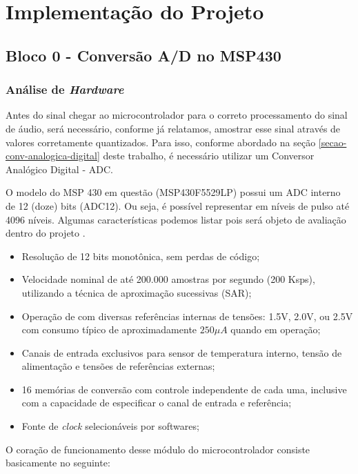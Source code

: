 \chapter{Implementação do Projeto}

\section{Bloco 0 - Conversão A/D no MSP430}
	
	\subsection{Análise de \textit{Hardware}}
	
		Antes do sinal chegar ao microcontrolador para o correto processamento do sinal de áudio, será necessário, conforme já relatamos, amostrar esse sinal através de valores corretamente quantizados. Para isso, conforme abordado na seção \ref{secao-conv-analogica-digital} deste trabalho, é necessário utilizar um Conversor Analógico Digital - ADC.
		
		O modelo do MSP 430 em questão (MSP430F5529LP) possui um ADC interno de 12 (doze) bits (ADC12). Ou seja, é possível representar em níveis de pulso até 4096 níveis. Algumas características podemos listar pois será objeto de avaliação dentro do projeto \cite{Davies2008}.
		
		\begin{itemize}
			\item Resolução de 12 bits monotônica, sem perdas de código;
			\item Velocidade nominal de até 200.000 amostras por segundo (200 Ksps), utilizando a técnica de aproximação sucessivas (SAR);
			\item Operação de com diversas referências internas de tensões: 1.5V, 2.0V, ou 2.5V com consumo típico de aproximadamente $250\mu A$ quando em operação;
			\item Canais de entrada exclusivos para sensor de temperatura interno, tensão de alimentação e tensões de referências externas;
			\item 16 memórias de conversão com controle independente de cada uma, inclusive com a capacidade de especificar o canal de entrada e referência;
			\item Fonte de \textit{clock} selecionáveis por softwares;
		\end{itemize}
	
		O coração de funcionamento desse módulo do microcontrolador consiste basicamente no seguinte:
		

